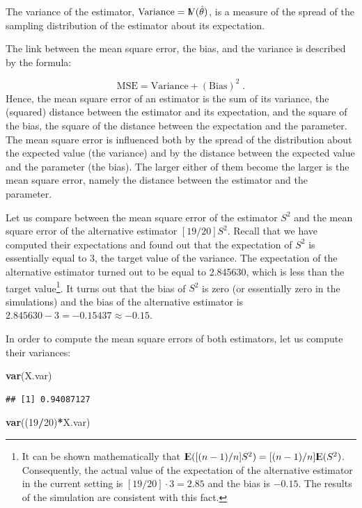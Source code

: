 \documentclass[]{krantz}
\makeatletter
\newenvironment{Shaded}{\begin{snugshade}}{\end{snugshade}}
\newcommand{\KeywordTok}[1]{\textcolor[rgb]{0.13,0.29,0.53}{\textbf{#1}}}
\newcommand{\DecValTok}[1]{\textcolor[rgb]{0.00,0.00,0.81}{#1}}
\newcommand{\OperatorTok}[1]{\textcolor[rgb]{0.81,0.36,0.00}{\textbf{#1}}}
\newcommand{\NormalTok}[1]{#1}
\newcommand{\Expec}{{\rm I\kern-.3em E}}
\newcommand{\Var}{{\rm I\kern-.3em V}}
\newenvironment{kframe}{%
\medskip{}
\setlength{\fboxsep}{.8em}
 \def\at@end@of@kframe{}%
 \ifinner\ifhmode%
  \def\at@end@of@kframe{\end{minipage}}%
  \begin{minipage}{\columnwidth}%
 \fi\fi%
 \def\FrameCommand##1{\hskip\@totalleftmargin \hskip-\fboxsep
 \colorbox{shadecolor}{##1}\hskip-\fboxsep
     \hskip-\linewidth \hskip-\@totalleftmargin \hskip\columnwidth}%
 \MakeFramed {\advance\hsize-\width
   \@totalleftmargin\z@ \linewidth\hsize
   \@setminipage}}%
 {\par\unskip\endMakeFramed%
 \at@end@of@kframe}
\renewenvironment{Shaded}{\begin{kframe}}{\end{kframe}}
\theoremstyle{definition}
\theoremstyle{definition}
\theoremstyle{definition}
\theoremstyle{remark}
\makeatother
\begin{document}
The variance of the estimator, \(\mbox{Variance} = \Var(\hat \theta)\),
is a measure of the spread of the sampling distribution of the estimator
about its expectation.

The link between the mean square error, the bias, and the variance is
described by the formula:

\[\mbox{MSE} = \mbox{Variance} + (\mbox{Bias})^2\;.\] Hence, the mean
square error of an estimator is the sum of its variance, the (squared)
distance between the estimator and its expectation, and the square of
the bias, the square of the distance between the expectation and the
parameter. The mean square error is influenced both by the spread of the
distribution about the expected value (the variance) and by the distance
between the expected value and the parameter (the bias). The larger
either of them become the larger is the mean square error, namely the
distance between the estimator and the parameter.

Let us compare between the mean square error of the estimator \(S^2\)
and the mean square error of the alternative estimator \([19/20] S^2\).
Recall that we have computed their expectations and found out that the
expectation of \(S^2\) is essentially equal to 3, the target value of
the variance. The expectation of the alternative estimator turned out to
be equal to 2.845630, which is less than the target value\footnote{It
  can be shown mathematically that
  \(\Expec([(n-1)/n] S^2) = [(n-1)/n] \Expec(S^2)\). Consequently, the
  actual value of the expectation of the alternative estimator in the
  current setting is \([19/20]\cdot 3 = 2.85\) and the bias is
  \(-0.15\). The results of the simulation are consistent with this
  fact.}. It turns out that the bias of \(S^2\) is zero (or essentially
zero in the simulations) and the bias of the alternative estimator is
\(2.845630 - 3 = -0.15437 \approx -0.15\).

In order to compute the mean square errors of both estimators, let us
compute their variances:

\begin{Shaded}
\begin{Highlighting}[]
\KeywordTok{var}\NormalTok{(X.var)}
\end{Highlighting}
\end{Shaded}

\begin{verbatim}
## [1] 0.94087127
\end{verbatim}

\begin{Shaded}
\begin{Highlighting}[]
\KeywordTok{var}\NormalTok{((}\DecValTok{19}\OperatorTok{/}\DecValTok{20}\NormalTok{)}\OperatorTok{*}\NormalTok{X.var)}
\end{Highlighting}
\end{Shaded}
\end{document}

